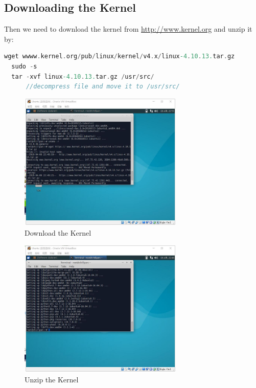 \documentclass[12pt,a4paper]{article}
\begin{document}
\subsection{Downloading the Kernel}
Then we need to download the kernel from {\color{blue}\url{http://www.kernel.org}} and unzip it by:

\begin{lstlisting}[language = C]
  wget wwww.kernel.org/pub/linux/kernel/v4.x/linux-4.10.13.tar.gz
  sudo -s  
  tar -xvf linux-4.10.13.tar.gz /usr/src/  
      //decompress file and move it to /usr/src/ 
\end{lstlisting}

\begin{minipage}{0.5\textwidth}
	\begin{figure}[H]
		\centering
		\includegraphics[width= 0.7\textwidth]{./fig/4_download_kernel.jpg}
		\caption{Download the Kernel}
		\label{fig:download kernel }
	\end{figure}
\end{minipage}
\begin{minipage}{0.5\textwidth}
	\begin{figure}[H]
		\centering
		\includegraphics[width= 0.7\textwidth]{./fig/3_install_gcc_python_2.jpg}
		\caption{Unzip the Kernel}
		\label{fig:unzip kernel}
	\end{figure}
\end{minipage}
\end{document}
